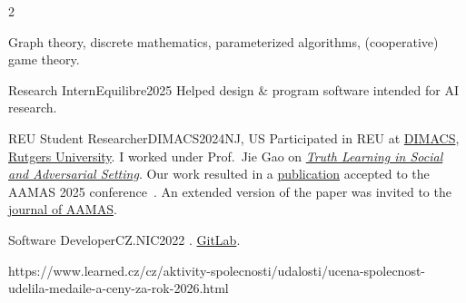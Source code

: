 \begin{multicols}{2}
\raggedcolumns


Graph theory,
discrete mathematics,
parameterized algorithms,
(cooperative) game theory.



\begin{work}{Research Intern}{Equilibre}{2025}{\Praha{}}
	{Helped design \& program software intended for AI research.}
\end{work}

\worksplit

\begin{work}{REU Student Researcher}{DIMACS}{2024}{NJ, US}
	{Participated in REU at} \href{http://dmac.rutgers.edu/}{DIMACS}, \href{https://www.rutgers.edu/}{Rutgers University}.
	{I worked under Prof.\ Jie Gao on} \emph{\href{https://reu.dimacs.rutgers.edu/~fu37/}{Truth Learning in Social and Adversarial Setting}}.
	{Our work resulted in a \href{https://furadnik.github.io/projects/2025-truth-learning}{publication} accepted to the AAMAS 2025 conference}~\cite{aamas25}.
	{An extended version of the paper was invited to the \href{https://link.springer.com/journal/10458}{journal of AAMAS}.}
\end{work}

\worksplit

\begin{work}{Software Developer}{CZ.NIC}{2022}{\Praha{}}
	.
	 \href{https://gitlab.nic.cz/fred/eppic}{GitLab}.
\end{work}


{https://www.learned.cz/cz/aktivity-spolecnosti/udalosti/ucena-spolecnost-udelila-medaile-a-ceny-za-rok-2026.html}
{}
{}


\end{multicols}
